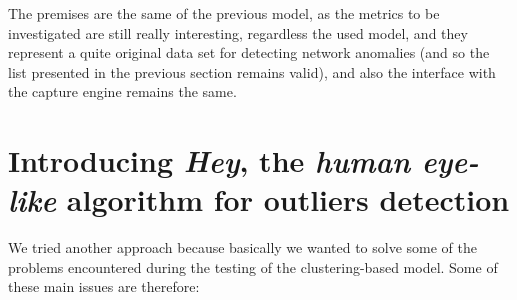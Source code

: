 \documentclass[12pt,a4paper,cucitura]{toptesi}
\begin{document}
The premises are the same of the previous model, as the metrics to be investigated are still really interesting, regardless the used model, and they represent a quite original data set for detecting network anomalies (and so the list presented in the previous section remains valid), and also the interface with the capture engine remains the same.

\section{Introducing \textit{Hey}, the \textit{human eye-like} algorithm for outliers detection}

We tried another approach because basically we wanted to solve some of the problems encountered during the testing of the clustering-based model. Some of these main issues are therefore:
\end{document}
